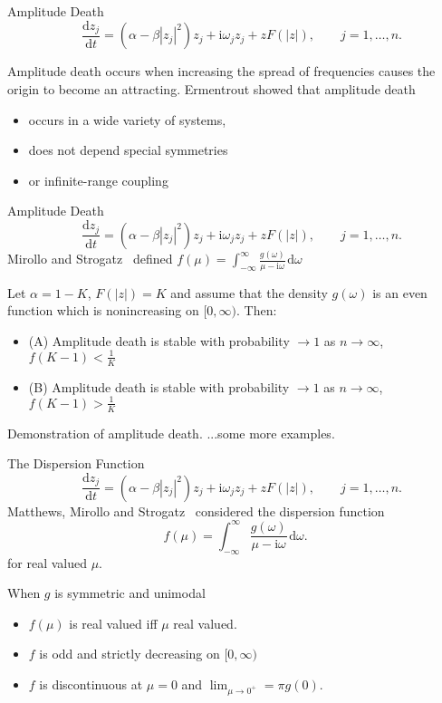 \documentclass[10pt,reqno]{beamer}
\newcommand{\D}[2]{\frac{\mathrm{d} #1}{\mathrm{d} #2}}
\newcommand{\I}{\mathrm{i}}
\newcommand{\df}[1]{\mspace{2mu}  \mathrm{d}#1}
\begin{document}
\begin{frame}{Amplitude Death}
\[
\quad \D{z_j}{t} = (\alpha - \beta|z_j|^2)z_j + \I\omega_jz_j +zF(|z|), \qquad j = 1,\ldots, n.
\]

Amplitude death occurs when increasing the spread of frequencies causes the origin to become an attracting.
\vfill
Ermentrout\cite{Ermentrout90} showed that amplitude death 
\begin{itemize}
\item occurs in a wide variety of systems, 
\item does not depend special symmetries 
\item or infinite-range coupling
\end{itemize}
\end{frame}
\begin{frame}{Amplitude Death}
\[
\quad \D{z_j}{t} = (\alpha - \beta|z_j|^2)z_j + \I\omega_jz_j +zF(|z|), \qquad j = 1,\ldots, n.
\]
Mirollo and Strogatz~\cite{Mirollo90} defined
$f(\mu) = \int_{-\infty}^\infty \frac{g(\omega)}{\mu - \I\omega}\df{\omega}$
\begin{tcolorbox}[notitle, boxrule=0pt, colback=lred]
\begin{theorem}
Let $\alpha = 1-K$, $F(|z|)=K$ and assume that the density $g(\omega)$ is an even function which is nonincreasing on $[0,\infty)$.
Then: 
\begin{itemize}
	\item (A) Amplitude death is stable with 
	probability $\rightarrow 1$ as $n \rightarrow \infty$, $f(K-1) < \frac{1}{K}$
\item (B) Amplitude death is stable with 
probability $\rightarrow 1$ as $n \rightarrow \infty$, $f(K-1) > \frac{1}{K}$
\end{itemize}
\end{theorem}
\end{tcolorbox}
\end{frame}
\begin{frame}{Demonstration of amplitude death.}
\centering
\vfill
...some more examples.
\end{frame}
\begin{frame}{The Dispersion Function}
\[
\quad \D{z_j}{t} = (\alpha - \beta|z_j|^2)z_j + \I\omega_jz_j +zF(|z|), \qquad j = 1,\ldots, n.
\]
Matthews, Mirollo and Strogatz~\cite{Matthews91} considered the dispersion function
\[f(\mu) = \int_{-\infty}^\infty \frac{g(\omega)}{\mu - \I\omega}\df{\omega}.\]
for real valued $\mu$.

When $g$ is symmetric and unimodal
\begin{itemize}
\item $f(\mu)$ is real valued iff $\mu$ real valued.
\item $f$ is odd and strictly decreasing on $[0,\infty)$
\item $f$ is discontinuous at $\mu=0$ and $\lim_{\mu\rightarrow 0^+} = \pi g(0)$.
\end{itemize}
\end{frame}
\end{document}
